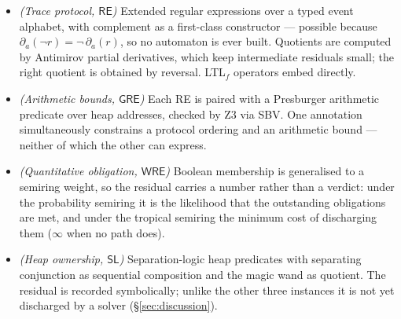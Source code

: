 \documentclass[acmsmall,screen]{acmart}
\newcommand{\RE}{\mathsf{RE}}
\newcommand{\GRE}{\mathsf{GRE}}
\newcommand{\WRE}{\mathsf{WRE}}
\newcommand{\SL}{\mathsf{SL}}
\newcommand{\derives}[2]{\partial_{#1}(#2)}
\begin{document}
\begin{itemize}[wide, labelindent=10pt]
  \item \emph{(Trace protocol, $\RE$)}
        Extended regular expressions over a typed event alphabet, with
        complement as a first-class constructor --- possible because
        $\derives{a}{\neg r} = \neg\,\derives{a}{r}$, so no automaton is
        ever built.
        Quotients are computed by Antimirov partial derivatives, which keep
        intermediate residuals small; the right quotient is obtained by
        reversal.
        LTL$_f$ operators embed directly.

  \item \emph{(Arithmetic bounds, $\GRE$)}
        Each RE is paired with a Presburger arithmetic predicate over
        heap addresses, checked by Z3 via SBV.
        One annotation simultaneously constrains a protocol ordering and
        an arithmetic bound --- neither of which the other can express.

  \item \emph{(Quantitative obligation, $\WRE$)}
        Boolean membership is generalised to a semiring weight, so the
        residual carries a number rather than a verdict:
        under the probability semiring it is the likelihood that the
        outstanding obligations are met, and under the tropical semiring
        the minimum cost of discharging them ($\infty$ when no path does).

  \item \emph{(Heap ownership, $\SL$)}
        Separation-logic heap predicates with separating conjunction as
        sequential composition and the magic wand as quotient.
        The residual is recorded symbolically; unlike the other three
        instances it is not yet discharged by a solver
        (\S\ref{sec:discussion}).
\end{itemize}
\end{document}
